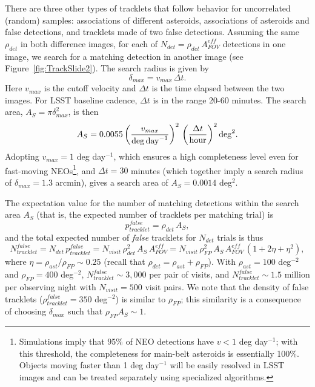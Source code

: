 There are three other types of tracklets that follow behavior for uncorrelated (random) 
samples: associations of different asteroids, associations of asteroids and false detections, 
and tracklets made of two false detections. Assuming the same $\rho_{det}$ in both 
difference images, for each of $N_{det} = \rho_{det} \, A_{FOV}^{eff}$ detections in one image,
we search for a matching detection in another image (see Figure~\ref{fig:TrackSlide2}). 
The search radius is given by 
\begin{equation}
                     \delta_{max} = v_{max} \, \Delta t . 
\end{equation}
Here $v_{max}$ is the  cutoff velocity and $\Delta t$ 
is the time elapsed between the two images. For LSST baseline cadence, $\Delta t$ is in 
the range 20-60 minutes. The search area, $A_S = \pi \delta_{max}^2$, is then 
\begin{equation}
\label{eq:AS} 
      A_S = 0.0055 \left( v_{max}  \over {\rm deg \, day}^{-1} \right)^2 \, \left(\Delta t \over {\rm hour} \right)^2 {\rm deg}^2.
\end{equation}
Adopting $v_{max} = 1$ deg day$^{-1}$, which ensures a high completeness level even for fast-moving 
NEOs\footnote{Simulations imply that 95\% of NEO detections have $v<1$ deg day$^{-1}$; with this threshold,
the completeness for main-belt asteroids is essentially 100\%. Objects moving faster than 1 deg day$^{-1}$ will
be easily resolved in LSST images and can be treated separately using specialized algorithms.}, and $\Delta t = 30$
minutes (which together  imply a search radius of $\delta_{max} = 1.3$ arcmin), gives a search area of 
$A_S = 0.0014$ deg$^2$. 


The expectation value for the number of matching detections within the search area $A_S$ (that is, the expected 
number of tracklets per matching trial) is 
\begin{equation}
                      p_{tracklet}^{false} =   \rho_{det}  \, A_S,
\end{equation}
and the total expected number of {\it false} tracklets for $N_{det}$ trials is thus 
\begin{equation}
\label{eq:NttFalse}
           N_{tracklet}^{false} = N_{det} \, p_{tracklet}^{false} =  N_{visit} \, \rho_{det}^2 \, A_S \, A_{FOV}^{eff} = N_{visit} \, \rho^2_{FP}  \, A_S \, A_{FOV}^{eff} \,  \left(1 + 2 \eta + \eta^2\right),
\end{equation}
where $\eta = \rho_{ast}  / \rho_{FP} \sim 0.25$ (recall that $\rho_{det} = \rho_{ast} + \rho_{FP}$). 
With $\rho_{ast} = 100$ deg$^{-2}$ and  $\rho_{FP} = 400$ deg$^{-2}$, 
$N_{tracklet}^{false} \sim 3,000$ per pair of visits, and $N_{tracklet}^{false} \sim 1.5$ million per observing night with 
$N_{visit}=500$ visit pairs. We note that the density of false tracklets ($\rho_{tracklet}^{false}=350$ deg$^{-2}$) is similar to 
$\rho_{FP}$; this similarity is a consequence of choosing $\delta_{max}$ such that $\rho_{FP} A_S \sim 1$. 

